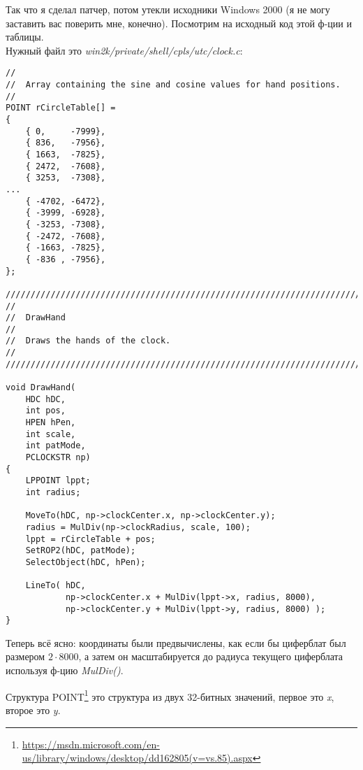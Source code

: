 Так что я сделал патчер, потом утекли исходники Windows 2000 (я не могу заставить вас поверить мне, конечно).
Посмотрим на исходный код этой ф-ции и таблицы.\\
Нужный файл это \emph{win2k/private/shell/cpls/utc/clock.c}:

\begin{lstlisting}[style=customc]
//
//  Array containing the sine and cosine values for hand positions.
//
POINT rCircleTable[] =
{
    { 0,     -7999},
    { 836,   -7956},
    { 1663,  -7825},
    { 2472,  -7608},
    { 3253,  -7308},
...
    { -4702, -6472},
    { -3999, -6928},
    { -3253, -7308},
    { -2472, -7608},
    { -1663, -7825},
    { -836 , -7956},
};

////////////////////////////////////////////////////////////////////////////
//
//  DrawHand
//
//  Draws the hands of the clock.
//
////////////////////////////////////////////////////////////////////////////

void DrawHand(
    HDC hDC,
    int pos,
    HPEN hPen,
    int scale,
    int patMode,
    PCLOCKSTR np)
{
    LPPOINT lppt;
    int radius;

    MoveTo(hDC, np->clockCenter.x, np->clockCenter.y);
    radius = MulDiv(np->clockRadius, scale, 100);
    lppt = rCircleTable + pos;
    SetROP2(hDC, patMode);
    SelectObject(hDC, hPen);

    LineTo( hDC,
            np->clockCenter.x + MulDiv(lppt->x, radius, 8000),
            np->clockCenter.y + MulDiv(lppt->y, radius, 8000) );
}
\end{lstlisting}

Теперь всё ясно: координаты были предвычислены, как если бы циферблат был размером $2 \cdot 8000$,
а затем он масштабируется до радиуса текущего циферблата используя ф-цию \emph{MulDiv()}.

Структура POINT\footnote{\url{https://msdn.microsoft.com/en-us/library/windows/desktop/dd162805(v=vs.85).aspx}}
это структура из двух 32-битных значений, первое это \emph{x}, второе это \emph{y}.

